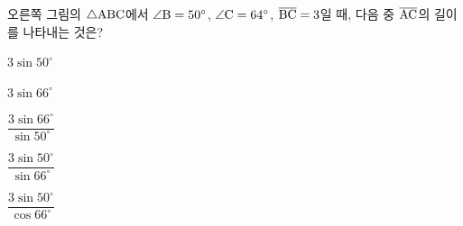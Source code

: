 \noindent\begin{minipage}[t]{0.58\linewidth}\vspace{0pt}\raggedright 오른쪽 그림의 $\triangle\mathrm{ABC}$에서 $\angle\mathrm{B}=50^\circ$, $\angle\mathrm{C}=64^\circ$, $\overline{\mathrm{BC}}=3$일 때, 다음 중 $\overline{\mathrm{AC}}$의 길이를 나타내는 것은?\end{minipage}\hfill\begin{minipage}[t]{0.4\linewidth}\vspace{0pt}\centering \resizebox{\ifdim\width>\linewidth\linewidth\else\width\fi}{!}{}\end{minipage}\par
\begin{choicesii}{\rule[-3ex]{0pt}{8ex}$3\sin 50^\circ$}{\rule[-3ex]{0pt}{8ex}$3\sin 66^\circ$}{\rule[-3ex]{0pt}{8ex}$\dfrac{3\sin 66^\circ}{\sin 50^\circ}$}{\rule[-3ex]{0pt}{8ex}$\dfrac{3\sin 50^\circ}{\sin 66^\circ}$}{\rule[-3ex]{0pt}{8ex}$\dfrac{3\sin 50^\circ}{\cos 66^\circ}$}\end{choicesii}
